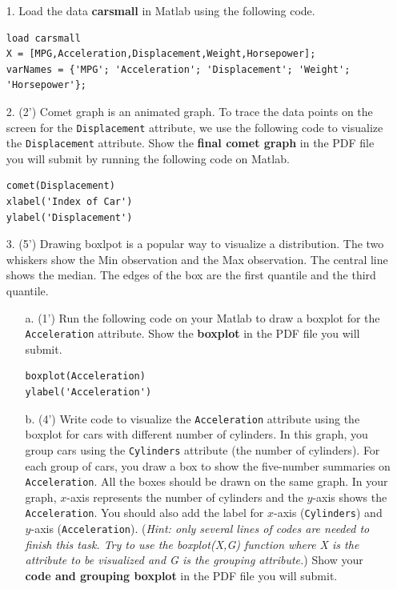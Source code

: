 \begin{enumerate}
\item[1.] Load the data \textbf{carsmall} in Matlab using the following code.
\begin{lstlisting}
load carsmall
X = [MPG,Acceleration,Displacement,Weight,Horsepower];
varNames = {'MPG'; 'Acceleration'; 'Displacement'; 'Weight'; 'Horsepower'};
\end{lstlisting}
\item[2.] (2') Comet graph is an animated graph. To trace the data points on the screen for the \texttt{Displacement} attribute, we use the following code to visualize the \texttt{Displacement} attribute. Show the \textbf{final comet graph} in the PDF file you will submit by running the following code on Matlab.
\begin{lstlisting}
comet(Displacement)
xlabel('Index of Car')
ylabel('Displacement')
\end{lstlisting}

\item[3.] (5') Drawing boxlpot is a popular way to visualize a distribution. The two whiskers show the Min observation and the Max observation. The central line shows the median. The edges of the box are the first quantile and the third quantile. 
\begin{itemize}
\item[a.] (1') Run the following code on your Matlab to draw a boxplot for the \texttt{Acceleration} attribute. Show the \textbf{boxplot}  in the PDF file you will submit.
\begin{lstlisting}
boxplot(Acceleration)
ylabel('Acceleration')
\end{lstlisting}
\item[b.] (4') Write code to visualize the \texttt{Acceleration} attribute using the boxplot for cars with different number of cylinders. In this graph, you group cars using the \texttt{Cylinders} attribute (the number of cylinders). For each group of cars, you draw a box to show the five-number summaries on \texttt{Acceleration}.  All the boxes should be drawn on the same graph. In your graph, $x$-axis represents the number of cylinders and the $y$-axis shows the \texttt{Acceleration}. You should also add the label for $x$-axis (\texttt{Cylinders}) and $y$-axis (\texttt{Acceleration}). (\textit{Hint: only several lines of codes are needed to finish this task. Try to use the boxplot(X,G) function where X is the attribute to be visualized and G is the grouping attribute.})
Show your \textbf{code and grouping boxplot} in the PDF file you will submit. 
\end{itemize}


\end{enumerate}
